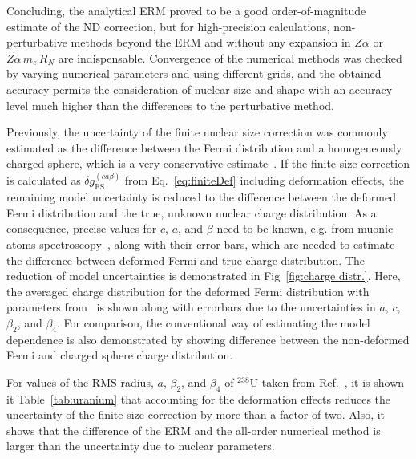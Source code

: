 Concluding, the analytical ERM proved to be a good order-of-magnitude estimate of the ND correction, but for high-precision calculations, non-perturbative methods beyond the ERM and without any expansion in $Z\alpha$ or $Z\alpha\, m_e\, R_N$ are indispensable. Convergence of the numerical methods was checked by varying numerical parameters and using different grids, and the obtained accuracy permits the consideration of nuclear size and shape with an accuracy level much higher than the differences to the perturbative method.

Previously, the uncertainty of the finite nuclear size correction was commonly estimated as the difference between the Fermi distribution and a homogeneously charged sphere, which is a very conservative estimate~\cite{Shabaev2006}. If the finite size correction is calculated as $\delta g^{(ca\beta)}_{\text{FS}}$ from Eq.~\eqref{eq:finiteDef} including deformation effects, the remaining model uncertainty is reduced to the difference between the deformed Fermi distribution and the true, unknown nuclear charge distribution.
As a consequence, precise values for $c$, $a$, and $\beta$ need to be known, e.g. from muonic atoms spectroscopy~\cite{Close1978,hitlin1970}, along with their error bars, which are needed to estimate the difference between deformed Fermi and true charge distribution. 
The reduction of model uncertainties is demonstrated in Fig~\ref{fig:charge distr.}. Here, the averaged charge distribution for the deformed Fermi distribution with parameters from~\cite{kozhedub2008} is shown along with errorbars due to the uncertainties in $a$, $c$, $\beta_2$, and $\beta_4$. For comparison, the conventional way of estimating the model dependence is also demonstrated by showing difference between the non-deformed Fermi and charged sphere charge distribution.

For values of the RMS radius, $a$, $\beta_2$, and $\beta_4$ of $^{238}$U  taken from Ref.~\cite{kozhedub2008}, it is shown it Table~\ref{tab:uranium} that accounting for the deformation effects reduces the uncertainty of the finite size correction by more than a factor of two. Also, it shows that the difference of the ERM and the all-order numerical method is larger than the uncertainty due to nuclear parameters.

